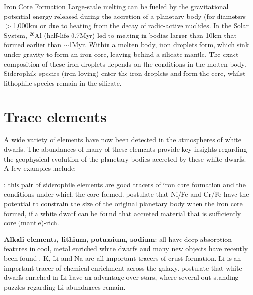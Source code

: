 \documentclass[onecolumn,authoryear]{els-mrw}
\begin{document}
\begin{BoxTypeA}{Iron Core Formation}
\indent Large-scale melting can be fueled by the gravitational potential energy released during the accretion of a planetary body (for diameters $>$1,000km or due to heating from the decay of radio-active nuclides. In the Solar System, $^{26}$Al (half-life 0.7Myr) led to melting in bodies larger than 10km that formed earlier than $\sim$1Myr. Within a molten body, iron droplets form, which sink under gravity to form an iron core, leaving behind a silicate mantle. The exact composition of these iron droplets depends on the conditions in the molten body. Siderophile species (iron-loving) enter the iron droplets and form the core, whilst lithophile species remain in the silicate. 
   
\end{BoxTypeA}






\section{Trace elements}

A wide variety of elements have now been detected in the atmospheres of white dwarfs. The abundances of many of these elements provide key insights regarding the geophysical evolution of the planetary bodies accreted by these white dwarfs. A few examples include:

\indent {}: this pair of siderophile elements are good tracers of iron core formation and the conditions under which the core formed. \cite{Buchan2022} postulate that Ni/Fe and Cr/Fe have the potential to constrain the size of the original planetary body when the iron core formed, if a white dwarf can be found that accreted material that is sufficiently core (mantle)-rich. 

{\bf Alkali elements, lithium, potassium, sodium}: all have deep absorption features in cool, metal enriched white dwarfs and many new objects have recently been found \citep{Kaiser2021, Hollands2021}. K, Li and Na are all important tracers of crust formation. Li is an important tracer of chemical enrichment across the galaxy.  \cite{Kaiser2021} postulate that white dwarfs enriched in Li have an advantage over stars, where several out-standing puzzles regarding Li abundances remain. 
\end{document}
